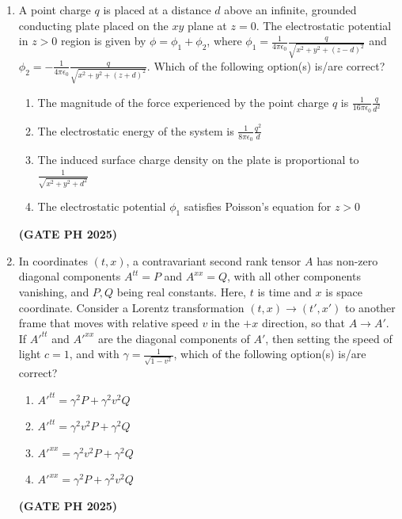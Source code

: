 \documentclass[14pt, a4paper]{extarticle}
\begin{document}
\begin{enumerate}[label=\textbf{Q.\arabic*}]
\item A point charge $q$ is placed at a distance $d$ above an infinite, grounded conducting plate placed on the $xy$ plane at $z=0$. The electrostatic potential in $z>0$ region is given by $\phi = \phi_1 + \phi_2$, where $\phi_1 = \frac{1}{4\pi\epsilon_0}\frac{q}{\sqrt{x^2+y^2+(z-d)^2}}$ and $\phi_2 = -\frac{1}{4\pi\epsilon_0}\frac{q}{\sqrt{x^2+y^2+(z+d)^2}}$. Which of the following option(s) is/are correct?
\begin{enumerate}
\item The magnitude of the force experienced by the point charge $q$ is $\frac{1}{16\pi\epsilon_0}\frac{q}{d^2}$
\item The electrostatic energy of the system is $\frac{1}{8\pi\epsilon_0}\frac{q^2}{d}$
\item The induced surface charge density on the plate is proportional to $\frac{1}{\sqrt{x^2+y^2+d^2}}$
\item The electrostatic potential $\phi_1$ satisfies Poisson's equation for $z > 0$
\end{enumerate}
\hfill \textbf{(GATE PH 2025)}

\item In coordinates $(t, x)$, a contravariant second rank tensor $A$ has non-zero diagonal components $A^{tt} = P$ and $A^{xx} = Q$, with all other components vanishing, and $P, Q$ being real constants. Here, $t$ is time and $x$ is space coordinate. Consider a Lorentz transformation $(t, x) \to (t', x')$ to another frame that moves with relative speed $v$ in the $+x$ direction, so that $A \to A'$. If $A'^{tt}$ and $A'^{xx}$ are the diagonal components of $A'$, then setting the speed of light $c=1$, and with $\gamma = \frac{1}{\sqrt{1-v^2}}$, which of the following option(s) is/are correct?
\begin{enumerate}
\item $A'^{tt} = \gamma^2 P + \gamma^2 v^2 Q$
\item $A'^{tt} = \gamma^2 v^2 P + \gamma^2 Q$
\item $A'^{xx} = \gamma^2 v^2 P + \gamma^2 Q$
\item $A'^{xx} = \gamma^2 P + \gamma^2 v^2 Q$
\end{enumerate}
\hfill \textbf{(GATE PH 2025)}


\end{enumerate}
\end{document}
